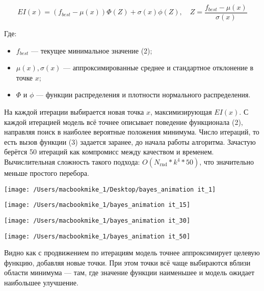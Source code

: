 \documentclass[12pt]{article}
\begin{document}
\[
EI(x) = (f_{best} - \mu(x)) \Phi(Z) + \sigma(x) \phi(Z), \quad Z = \frac{f_{best} - \mu(x)}{\sigma(x)} \tag{3}
\]

Где:
\begin{itemize}
    \item $f_{best}$ — текущее минимальное значение (2);
    \item $\mu(x), \sigma(x)$ — аппроксимированные среднее и стандартное отклонение в точке $x$;
    \item $\Phi$ и $\phi$ — функции распределения и плотности нормального распределения.
\end{itemize}

На каждой итерации выбирается новая точка $x$, максимизирующая $EI(x)$. С каждой итерацией модель всё точнее
описывает поведение функционала (2), направляя поиск в наиболее вероятные положения минимума.
Число итераций, то есть вызов функции (3) задается заранее, до начала работы алгоритма.
Зачастую берётся 50 итераций как компромисс между качеством и временем. Вычислительная сложность такого подхода:
 $O(N_{\text{rnd}}*k^4*50)$, что значительно меньше простого перебора.

\begin{center}
    \begin{minipage}{0.48\textwidth}
        \texttt{[image: /Users/macbookmike\_1/Desktop/bayes\_animation it\_1]}
    \end{minipage}
    \hfill
    \begin{minipage}{0.48\textwidth}
        \texttt{[image: /Users/macbookmike\_1/bayes\_animation it\_15]}
    \end{minipage}
\end{center}

\begin{center}
    \begin{minipage}{0.48\textwidth}
        \texttt{[image: /Users/macbookmike\_1/bayes\_animation it\_30]}
    \end{minipage}
    \hfill
    \begin{minipage}{0.48\textwidth}
        \texttt{[image: /Users/macbookmike\_1/bayes\_animation it\_50]}
    \end{minipage}
\end{center}

Видно как с продвижением по итерациям модель точнее аппроксимирует целевую функцию, добавляя новые точки.
При этом точки всё чаще выбираются вблизи области минимума — там, где значение функции наименьшее
и модель ожидает наибольшее улучшение.
\end{document}
